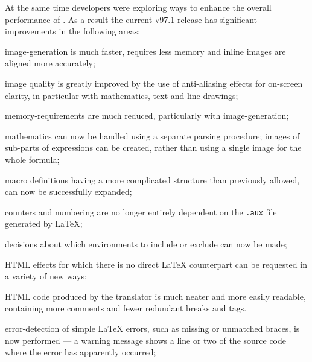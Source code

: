 At the same time developers were exploring ways to enhance the overall
performance of \latextohtml.
As a result the current \textsc{v97.1} release has significant improvements in
the following areas:
%
\begin{htmllist}
%
\item[image-generation]
is much faster, requires less memory
and inline images are aligned more accurately;
%
\item[image quality]
is greatly improved by the use of anti-aliasing effects for on-screen clarity,
in particular with mathematics, text and line-drawings;
%
\item[memory-requirements]
are much reduced, particularly with image-generation;
%
\item[mathematics]
can now be handled using a separate parsing procedure;
images of sub-parts of expressions can be created, rather
than using a single image for the whole formula;
%
\item[macro definitions]
having a more complicated structure than previously allowed,
can now be successfully expanded;
%
\item[counters]
and numbering are no longer entirely dependent on the \texttt{.aux}
file generated by \LaTeX;
%
\item[decisions]
about which environments to include or exclude can now be made;
%
\item[HTML effects]
for which there is no direct \LaTeX{} counterpart
can be requested in a variety of new ways;
%
\item[HTML code]
produced by the translator is much neater and more easily readable,
containing more comments and fewer redundant breaks and  tags.
%
\item[error-detection]
of simple \LaTeX{} errors, such as missing or unmatched braces,
is now performed --- a warning message shows a line or two
of the source code where the error has apparently occurred;
%
\end{htmllist}


